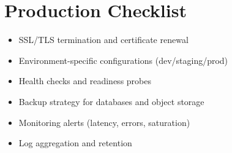 \documentclass{article}
\begin{document}
\section{Production Checklist}

\begin{itemize}[leftmargin=*]
  \item SSL/TLS termination and certificate renewal
  \item Environment-specific configurations (dev/staging/prod)
  \item Health checks and readiness probes
  \item Backup strategy for databases and object storage
  \item Monitoring alerts (latency, errors, saturation)
  \item Log aggregation and retention
\end{itemize}
\end{document}
